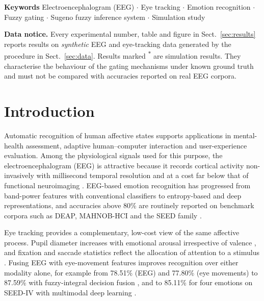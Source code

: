 \documentclass[11pt,a4paper]{article}
\newcommand{\simnote}{\textsuperscript{$\ast$}}
\begin{document}
\noindent\textbf{Keywords} Electroencephalogram (EEG) $\cdot$ Eye tracking $\cdot$ Emotion recognition $\cdot$ Fuzzy gating $\cdot$ Sugeno fuzzy inference system $\cdot$ Simulation study

\begin{framed}
\noindent\small\textbf{Data notice.} Every experimental number, table and figure in Sect.~\ref{sec:results} reports results on \emph{synthetic} EEG and eye-tracking data generated by the procedure in Sect.~\ref{sec:data}. Results marked \simnote{} are simulation results. They characterise the behaviour of the gating mechanisms under known ground truth and must not be compared with accuracies reported on real EEG corpora.
\end{framed}

\section{Introduction}
\label{sec:intro}

Automatic recognition of human affective states supports applications in mental-health assessment, adaptive human--computer interaction and user-experience evaluation. Among the physiological signals used for this purpose, the electroencephalogram (EEG) is attractive because it records cortical activity non-invasively with millisecond temporal resolution and at a cost far below that of functional neuroimaging \cite{Alarcao2019,Jenke2014}. EEG-based emotion recognition has progressed from band-power features with conventional classifiers to entropy-based and deep representations, and accuracies above 80\% are routinely reported on benchmark corpora such as DEAP, MAHNOB-HCI and the SEED family \cite{Koelstra2012,Soleymani2012db,ZhengLu2015,Zheng2019}.

Eye tracking provides a complementary, low-cost view of the same affective process. Pupil diameter increases with emotional arousal irrespective of valence \cite{Bradley2008,Partala2003}, and fixation and saccade statistics reflect the allocation of attention to a stimulus \cite{Lim2020}. Fusing EEG with eye-movement features improves recognition over either modality alone, for example from 78.51\% (EEG) and 77.80\% (eye movements) to 87.59\% with fuzzy-integral decision fusion \cite{Lu2015}, and to 85.11\% for four emotions on SEED-IV with multimodal deep learning \cite{Zheng2019}.
\end{document}
